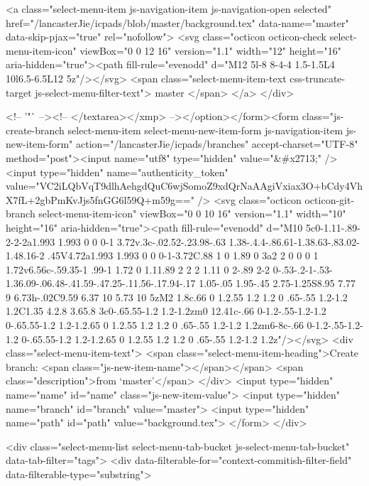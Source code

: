             <a class="select-menu-item js-navigation-item js-navigation-open selected"
               href="/lancasterJie/icpads/blob/master/background.tex"
               data-name="master"
               data-skip-pjax="true"
               rel="nofollow">
              <svg class="octicon octicon-check select-menu-item-icon" viewBox="0 0 12 16" version="1.1" width="12" height="16" aria-hidden="true"><path fill-rule="evenodd" d="M12 5l-8 8-4-4 1.5-1.5L4 10l6.5-6.5L12 5z"/></svg>
              <span class="select-menu-item-text css-truncate-target js-select-menu-filter-text">
                master
              </span>
            </a>
        </div>

          <!-- '"` --><!-- </textarea></xmp> --></option></form><form class="js-create-branch select-menu-item select-menu-new-item-form js-navigation-item js-new-item-form" action="/lancasterJie/icpads/branches" accept-charset="UTF-8" method="post"><input name="utf8" type="hidden" value="&#x2713;" /><input type="hidden" name="authenticity_token" value="VC2iLQbVqT9dlhAehgdQuC6wjSomoZ9xdQrNaAAgiVxiax3O+bCdy4VhX7fL+2gbPmKvJjs5fnGG6l59Q+m59g==" />
          <svg class="octicon octicon-git-branch select-menu-item-icon" viewBox="0 0 10 16" version="1.1" width="10" height="16" aria-hidden="true"><path fill-rule="evenodd" d="M10 5c0-1.11-.89-2-2-2a1.993 1.993 0 0 0-1 3.72v.3c-.02.52-.23.98-.63 1.38-.4.4-.86.61-1.38.63-.83.02-1.48.16-2 .45V4.72a1.993 1.993 0 0 0-1-3.72C.88 1 0 1.89 0 3a2 2 0 0 0 1 1.72v6.56c-.59.35-1 .99-1 1.72 0 1.11.89 2 2 2 1.11 0 2-.89 2-2 0-.53-.2-1-.53-1.36.09-.06.48-.41.59-.47.25-.11.56-.17.94-.17 1.05-.05 1.95-.45 2.75-1.25S8.95 7.77 9 6.73h-.02C9.59 6.37 10 5.73 10 5zM2 1.8c.66 0 1.2.55 1.2 1.2 0 .65-.55 1.2-1.2 1.2C1.35 4.2.8 3.65.8 3c0-.65.55-1.2 1.2-1.2zm0 12.41c-.66 0-1.2-.55-1.2-1.2 0-.65.55-1.2 1.2-1.2.65 0 1.2.55 1.2 1.2 0 .65-.55 1.2-1.2 1.2zm6-8c-.66 0-1.2-.55-1.2-1.2 0-.65.55-1.2 1.2-1.2.65 0 1.2.55 1.2 1.2 0 .65-.55 1.2-1.2 1.2z"/></svg>
            <div class="select-menu-item-text">
              <span class="select-menu-item-heading">Create branch: <span class="js-new-item-name"></span></span>
              <span class="description">from ‘master’</span>
            </div>
            <input type="hidden" name="name" id="name" class="js-new-item-value">
            <input type="hidden" name="branch" id="branch" value="master">
            <input type="hidden" name="path" id="path" value="background.tex">
</form>
      </div>

      <div class="select-menu-list select-menu-tab-bucket js-select-menu-tab-bucket" data-tab-filter="tags">
        <div data-filterable-for="context-commitish-filter-field" data-filterable-type="substring">


